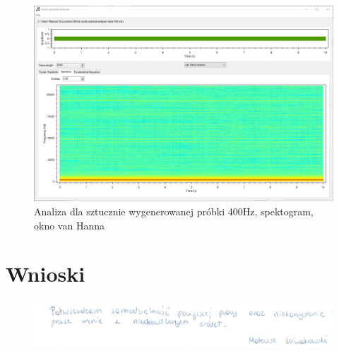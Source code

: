 \documentclass{article}
\begin{document}
\begin{figure}[H]
\includegraphics[width=\textwidth]{scr6.png}
\caption{Analiza dla sztucznie wygenerowanej próbki 400Hz, spektogram, okno van Hanna}
\label{fig:interface}
\end{figure}

\section{Wnioski}

\begin{figure}[b]
\centering
\includegraphics[width=5in]{bottom.png}
\end{figure}
\end{document}
